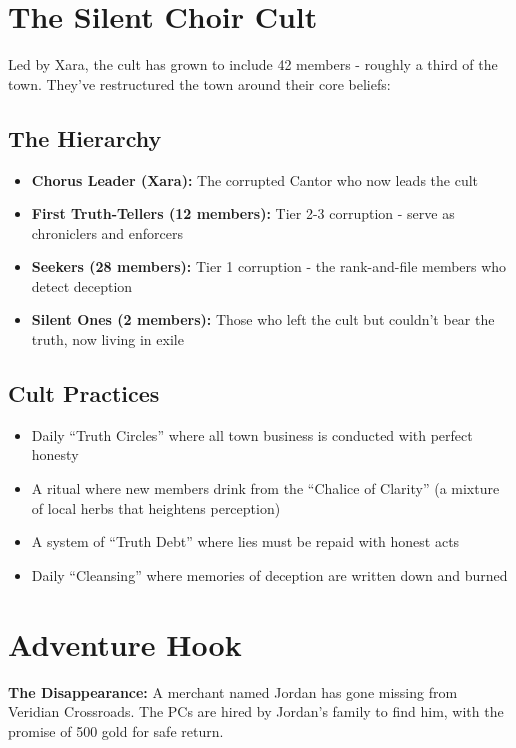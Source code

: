 \documentclass[11pt]{article}
\newcommand{\keypoint}[1]{\par\noindent\textbf{\textcolor{accentorange}{#1}}}
\begin{document}
\section{The Silent Choir Cult}

Led by Xara, the cult has grown to include 42 members - roughly a third of the town. They've restructured the town around their core beliefs:

\subsection{The Hierarchy}
\begin{itemize}[leftmargin=*]
    \item \textbf{Chorus Leader (Xara):} The corrupted Cantor who now leads the cult
    \item \textbf{First Truth-Tellers (12 members):} Tier 2-3 corruption - serve as chroniclers and enforcers
    \item \textbf{Seekers (28 members):} Tier 1 corruption - the rank-and-file members who detect deception
    \item \textbf{Silent Ones (2 members):} Those who left the cult but couldn't bear the truth, now living in exile
\end{itemize}

\subsection{Cult Practices}
\begin{itemize}[leftmargin=*]
    \item Daily ``Truth Circles'' where all town business is conducted with perfect honesty
    \item A ritual where new members drink from the ``Chalice of Clarity'' (a mixture of local herbs that heightens perception)
    \item A system of ``Truth Debt'' where lies must be repaid with honest acts
    \item Daily ``Cleansing'' where memories of deception are written down and burned
\end{itemize}

\section{Adventure Hook}

\keypoint{The Disappearance:} A merchant named Jordan has gone missing from Veridian Crossroads. The PCs are hired by Jordan's family to find him, with the promise of 500 gold for safe return.
\end{document}

